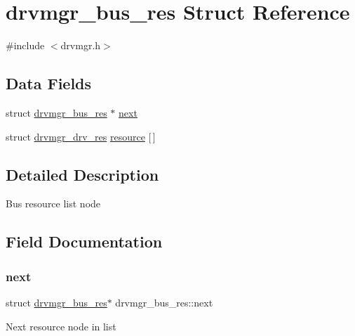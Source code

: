 \hypertarget{structdrvmgr__bus__res}{}\section{drvmgr\+\_\+bus\+\_\+res Struct Reference}
\label{structdrvmgr__bus__res}


{\ttfamily \#include $<$drvmgr.\+h$>$}

\subsection*{Data Fields}
\begin{DoxyCompactItemize}
\item 
struct \mbox{\hyperlink{structdrvmgr__bus__res}{drvmgr\+\_\+bus\+\_\+res}} $\ast$ \mbox{\hyperlink{structdrvmgr__bus__res_a92660e37f6211eb2bb24739c8ae99339}{next}}
\item 
struct \mbox{\hyperlink{structdrvmgr__drv__res}{drvmgr\+\_\+drv\+\_\+res}} \mbox{\hyperlink{structdrvmgr__bus__res_a1b80e82d17e823de898c086be7266523}{resource}} \mbox{[}$\,$\mbox{]}
\end{DoxyCompactItemize}


\subsection{Detailed Description}
Bus resource list node 

\subsection{Field Documentation}
\mbox{\label{structdrvmgr__bus__res_a92660e37f6211eb2bb24739c8ae99339}} 
\subsubsection{\texorpdfstring{next}{next}}
{\footnotesize\ttfamily struct \mbox{\hyperlink{structdrvmgr__bus__res}{drvmgr\+\_\+bus\+\_\+res}}$\ast$ drvmgr\+\_\+bus\+\_\+res\+::next}

Next resource node in list \mbox{\label{structdrvmgr__bus__res_a1b80e82d17e823de898c086be7266523}} 
